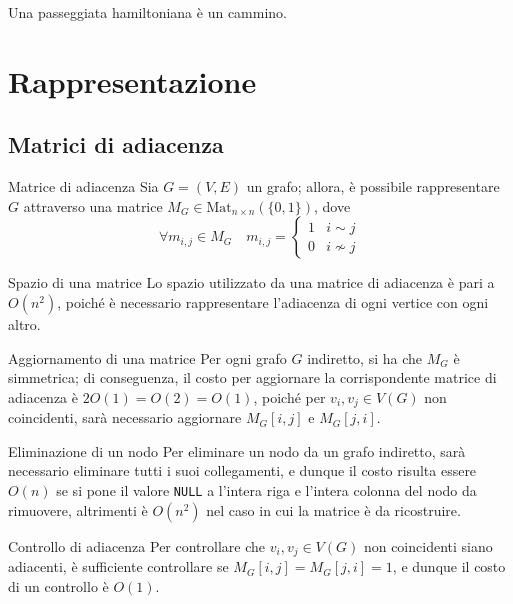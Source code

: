 \documentclass[a4paper, 12pt]{report}
\begin{document}
    \begin{framedobs}{}
        Una passeggiata hamiltoniana è un cammino.
    \end{framedobs}

    \section{Rappresentazione}

    \subsection{Matrici di adiacenza}

    \begin{frameddefn}{Matrice di adiacenza}
        Sia $G = (V, E)$ un grafo; allora, è possibile rappresentare $G$ attraverso una matrice $M_G \in \textrm{Mat}_{n \times n}(\{0, 1\})$, dove $$\forall m_{i, j} \in M_G \quad m_{i, j} = \left \{ \begin{array}{ll} 1 & i \sim j\\ 0 & i \nsim j \end{array} \right.$$
    \end{frameddefn}

    \begin{framedobs}{Spazio di una matrice}
        Lo spazio utilizzato da una matrice di adiacenza è pari a $O(n^2)$, poiché è necessario rappresentare l'adiacenza di ogni vertice con ogni altro.
    \end{framedobs}

    \begin{framedobs}{Aggiornamento di una matrice}
        Per ogni grafo $G$ indiretto, si ha che $M_G$ è simmetrica; di conseguenza, il costo per aggiornare la corrispondente matrice di adiacenza è $2 O(1)= O(2) = O(1)$, poiché per $v_i, v_j \in V(G)$ non coincidenti, sarà necessario aggiornare $M_G[i, j]$ e $M_G[j, i]$.
    \end{framedobs}

    \begin{framedobs}{Eliminazione di un nodo}
        Per eliminare un nodo da un grafo indiretto, sarà necessario eliminare tutti i suoi collegamenti, e dunque il costo risulta essere $O(n)$ se si pone il valore \texttt{NULL} a l'intera riga e l'intera colonna del nodo da rimuovere, altrimenti è $O(n^2)$ nel caso in cui la matrice è da ricostruire.
    \end{framedobs}

    \begin{framedobs}{Controllo di adiacenza}
        Per controllare che $v_i, v_j \in V(G)$ non coincidenti siano adiacenti, è sufficiente controllare se $M_G[i, j] = M_G[j, i] = 1$, e dunque il costo di un controllo è $O(1)$.
    \end{framedobs}
\end{document}
